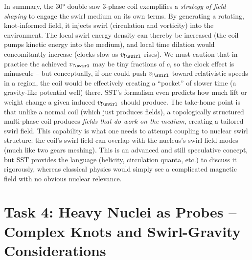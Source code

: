 \documentclass[11pt]{article}
\begin{document}
In summary, the 30° double saw 3-phase coil exemplifies a \textit{strategy of field shaping} to engage the swirl medium on its own terms. By generating a rotating, knot-informed field, it injects swirl (circulation and vorticity) into the environment. The local swirl energy density can thereby be increased (the coil pumps kinetic energy into the medium), and local time dilation would concomitantly increase (clocks slow as $v_{!\swirl}$ rises). We must caution that in practice the achieved $v_{!\swirl}$ may be tiny fractions of $c$, so the clock effect is minuscule – but conceptually, if one could push $v_{!\swirl}$ toward relativistic speeds in a region, the coil would be effectively creating a “pocket” of slower time (a gravity-like potential well) there. SST’s formalism even predicts how much lift or weight change a given induced $v_{!\swirl}$ should produce. The take-home point is that unlike a normal coil (which just produces fields), a topologically structured multi-phase coil produces \textit{fields that do work on the medium}, creating a tailored swirl field. This capability is what one needs to attempt coupling to nuclear swirl structure: the coil’s swirl field can overlap with the nucleus’s swirl field modes (much like two gears meshing). This is an advanced and still speculative concept, but SST provides the language (helicity, circulation quanta, etc.) to discuss it rigorously, whereas classical physics would simply see a complicated magnetic field with no obvious nuclear relevance.


\section*{Task 4: Heavy Nuclei as Probes – Complex Knots and Swirl-Gravity Considerations}
\end{document}
